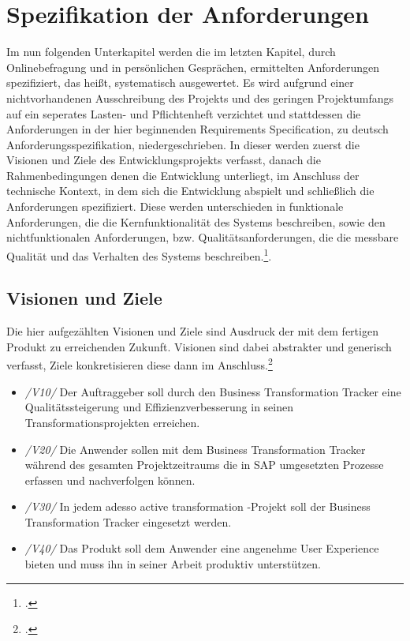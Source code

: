 \section{Spezifikation der Anforderungen}
Im nun folgenden Unterkapitel werden die im letzten Kapitel, durch Onlinebefragung und in persönlichen Gesprächen, ermittelten Anforderungen spezifiziert, das heißt, systematisch ausgewertet. Es wird aufgrund einer nichtvorhandenen Ausschreibung des Projekts und des geringen Projektumfangs auf ein seperates Lasten- und Pflichtenheft verzichtet und stattdessen die Anforderungen in der hier beginnenden \glqq{}Requirements Specification\grqq{}, zu deutsch \glqq{}Anforderungsspezifikation\grqq{}, niedergeschrieben. In dieser werden zuerst die Visionen und Ziele des Entwicklungsprojekts verfasst, danach die Rahmenbedingungen denen die Entwicklung unterliegt, im Anschluss der technische Kontext, in dem sich die Entwicklung abspielt und schließlich die Anforderungen spezifiziert. Diese werden unterschieden in funktionale Anforderungen, die die Kernfunktionalität des Systems beschreiben, sowie den nichtfunktionalen Anforderungen, bzw. Qualitätsanforderungen, die die messbare Qualität und das Verhalten des Systems beschreiben.\footcite[Vgl.][S. 492 ff.]{balzert}. 

\subsection{Visionen und Ziele}
Die hier aufgezählten Visionen und Ziele sind Ausdruck der mit dem fertigen Produkt zu erreichenden Zukunft. Visionen sind dabei abstrakter und generisch verfasst, Ziele konkretisieren diese dann im Anschluss.\footcite[Vgl.][S. 457]{balzert}
\begin{itemize}
    \item[] \emph{/V10/} Der Auftraggeber soll durch den Business Transformation Tracker eine Qualitätssteigerung und Effizienzverbesserung in seinen Transformationsprojekten erreichen.
    \item[] \emph{/V20/} Die Anwender sollen mit dem Business Transformation Tracker während des gesamten Projektzeitraums die in SAP umgesetzten Prozesse erfassen und nachverfolgen können.
    \item[] \emph{/V30/} In jedem adesso active transformation -Projekt soll der Business Transformation Tracker eingesetzt werden.
    \item[] \emph{/V40/} Das Produkt soll dem Anwender eine angenehme User Experience bieten und muss ihn in seiner Arbeit produktiv unterstützen.\\
\end{itemize}

